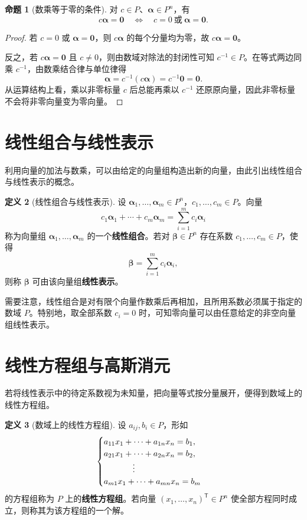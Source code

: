 \documentclass[UTF8, fontset=fandol, a4paper, 12pt]{ctexart}
\theoremstyle{definition}
\newtheorem{definition}{定义}[section]
\newtheorem{proposition}[definition]{命题}
\begin{document}
\begin{proposition}[数乘等于零的条件]
对 $c\in P$、$\boldsymbol\alpha\in P^n$，有
\[
 c\boldsymbol\alpha=\boldsymbol0
 \quad\Longleftrightarrow\quad c=0\ \text{或}\ \boldsymbol\alpha=\boldsymbol0.
\]
\end{proposition}
\begin{proof}
若 $c=0$ 或 $\boldsymbol\alpha=\boldsymbol0$，则 $c\boldsymbol\alpha$ 的每个分量均为零，故 $c\boldsymbol\alpha=\boldsymbol0$。

反之，若 $c\boldsymbol\alpha=\boldsymbol0$ 且 $c\ne0$，则由数域对除法的封闭性可知 $c^{-1}\in P$。在等式两边同乘 $c^{-1}$，由数乘结合律与单位律得
\[
 \boldsymbol\alpha=c^{-1}(c\boldsymbol\alpha)=c^{-1}\boldsymbol0=\boldsymbol0.
\]
从运算结构上看，乘以非零标量 $c$ 后总能再乘以 $c^{-1}$ 还原原向量，因此非零标量不会将非零向量变为零向量。
\end{proof}

\section{线性组合与线性表示}

利用向量的加法与数乘，可以由给定的向量组构造出新的向量，由此引出线性组合与线性表示的概念。

\begin{definition}[线性组合与线性表示]
设 $\boldsymbol\alpha_1,\ldots,\boldsymbol\alpha_m\in P^n$，$c_1,\ldots,c_m\in P$。向量
\[
  c_1\boldsymbol\alpha_1+\cdots+c_m\boldsymbol\alpha_m
  =\sum_{i=1}^{m}c_i\boldsymbol\alpha_i
\]
称为向量组 $\boldsymbol\alpha_1,\ldots,\boldsymbol\alpha_m$ 的一个\textbf{线性组合}。若对 $\boldsymbol\beta\in P^n$ 存在系数 $c_1,\ldots,c_m\in P$，使得
\[
  \boldsymbol\beta=\sum_{i=1}^{m}c_i\boldsymbol\alpha_i,
\]
则称 $\boldsymbol\beta$ 可由该向量组\textbf{线性表示}。
\end{definition}

需要注意，线性组合是对有限个向量作数乘后再相加，且所用系数必须属于指定的数域 $P$。特别地，取全部系数 $c_i=0$ 时，可知零向量可以由任意给定的非空向量组线性表示。

\section{线性方程组与高斯消元}

若将线性表示中的待定系数视为未知量，把向量等式按分量展开，便得到数域上的线性方程组。

\begin{definition}[数域上的线性方程组]
设 $a_{ij},b_i\in P$，形如
\[
  \begin{cases}
    a_{11}x_1+\cdots+a_{1n}x_n=b_1,\\
    a_{21}x_1+\cdots+a_{2n}x_n=b_2,\\
    \hspace{3.5em}\vdots\\
    a_{m1}x_1+\cdots+a_{mn}x_n=b_m
  \end{cases}
\]
的方程组称为 $P$ 上的\textbf{线性方程组}。若向量 $(x_1,\ldots,x_n)^{\mathsf T}\in P^n$ 使全部方程同时成立，则称其为该方程组的一个解。
\end{definition}
\end{document}
